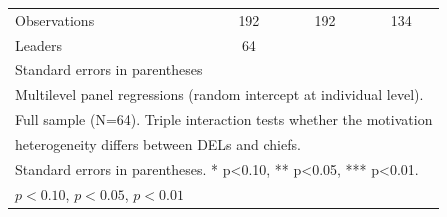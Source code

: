 \begin{table}[htbp]
\begin{tabular}{l*{3}{c}}
\midrule
Observations&         192         &         192         &         134         \\
Leaders     &          64         &                     &                     \\
\bottomrule
\multicolumn{4}{l}{\footnotesize Standard errors in parentheses}\\
\multicolumn{4}{l}{\footnotesize Multilevel panel regressions (random intercept at individual level).}\\
\multicolumn{4}{l}{\footnotesize Full sample (N=64). Triple interaction tests whether the motivation}\\
\multicolumn{4}{l}{\footnotesize heterogeneity differs between DELs and chiefs.}\\
\multicolumn{4}{l}{\footnotesize Standard errors in parentheses. * p<0.10, ** p<0.05, *** p<0.01.}\\
\multicolumn{4}{l}{\footnotesize \sym{*} \(p<0.10\), \sym{**} \(p<0.05\), \sym{***} \(p<0.01\)}\\
\end{tabular}
\end{table}
